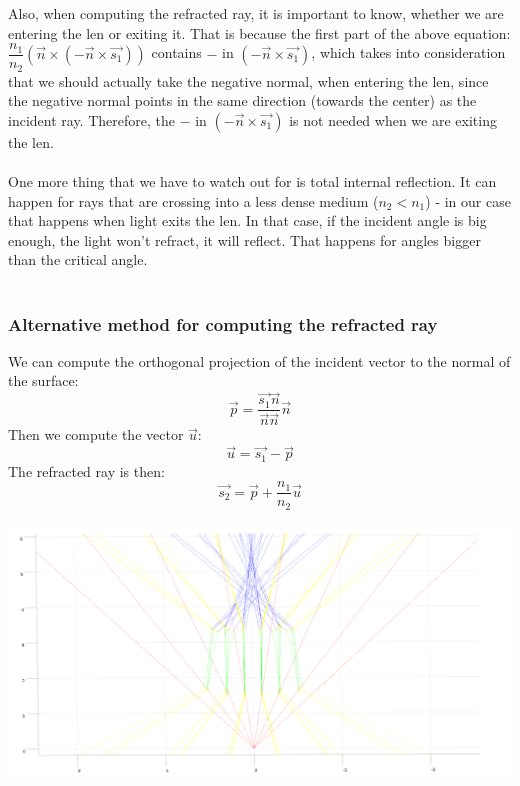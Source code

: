 \documentclass[A4]{article}
\begin{document}
Also, when computing the refracted ray, it is important to know, whether we are entering the len or exiting it. That is because the first part of the above equation: $\dfrac{n_1}{n_2}(\vec{n}\times(-\vec{n}\times\vec{s_1}))$ contains $-$ in $(-\vec{n}\times\vec{s_1})$, which takes into consideration that we should actually take the negative normal, when entering the len, since the negative normal points in the same direction (towards the center) as the incident ray. Therefore, the $-$ in  $(-\vec{n}\times\vec{s_1})$ is not needed when we are exiting the len.\\ \\
One more thing that we have to watch out for is total internal reflection. It can happen for rays that are crossing into a less dense medium ($n_2 < n_1$) - in our case that happens when light exits the len. In that case, if the incident angle is big enough, the light won't refract, it will reflect. That happens for angles bigger than the critical angle. \\\\

\subsubsection{Alternative method for computing the refracted ray}
We can compute the orthogonal projection of the incident vector to the normal of the surface:
\[
	\vec{p} = \dfrac{\vec{s_1} \vec{n}}{\vec{n} \vec{n}}\vec{n}
\]
Then we compute the vector $\vec{u}$:
\[
	\vec{u} = \vec{s_1} - \vec{p}
\]
The refracted ray is then:
\[
	\vec{s_2} = \vec{p} + \dfrac{n_1}{n_2}\vec{u}
\]

\vspace{10mm}

\includegraphics[scale=0.3]{rays_in}
\end{document}
